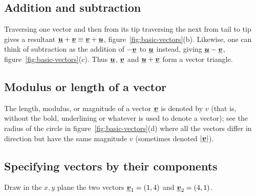 \subsection*{Addition and subtraction}
Traversing one vector and then from its tip traversing the next from tail to tip gives a resultant $\mathit{\underline{\boldsymbol{u}}} + \mathit{\underline{\boldsymbol{v}}} \equiv \mathit{\underline{\boldsymbol{v}}} + \mathit{\underline{\boldsymbol{u}}}$, figure~\ref{fig:basic-vectors}(b).  Likewise, one can think of subtraction as the addition of $-\mathit{\underline{\boldsymbol{v}}}$ to $\mathit{\underline{\boldsymbol{u}}}$ instead, giving $\mathit{\underline{\boldsymbol{u}}} - \mathit{\underline{\boldsymbol{v}}}$, figure~\ref{fig:basic-vectors}(c).  Thus $\mathit{\underline{\boldsymbol{u}}}$, $\mathit{\underline{\boldsymbol{v}}}$ and $\mathit{\underline{\boldsymbol{u}}} + \mathit{\underline{\boldsymbol{v}}}$ form a vector triangle.

\subsection*{Modulus or length of a vector}
The length, modulus, or magnitude of a vector $\mathit{\underline{\boldsymbol{v}}}$ is denoted by $v$ (that is, without the bold, underlining or whatever is used to denote a vector); see the radius of the circle in figure~\ref{fig:basic-vectors}(d) where all the vectors differ in direction but have the same magnitude $v$ (sometimes denoted $|\mathit{\underline{\boldsymbol{v}}}|$).

\subsection*{Specifying vectors by their components}
Draw in the $x,y$ plane the two vectors $\mathit{\underline{\boldsymbol{v}}}_1 = (1,4)$ and $\mathit{\underline{\boldsymbol{v}}}_2 = (4,1)$.



